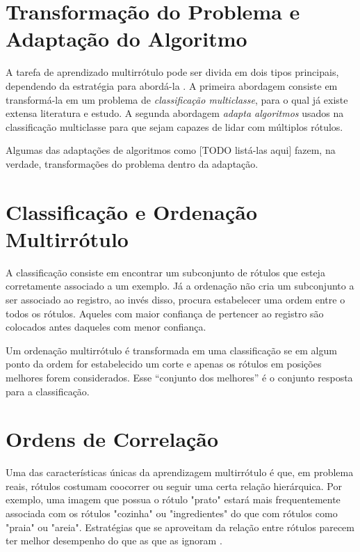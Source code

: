 \documentclass[runningheads,a4paper]{llncs}
\begin{document}
\section{Transformação do Problema e Adaptação do Algoritmo}

A tarefa de aprendizado multirrótulo pode ser divida em dois tipos principais, dependendo da estratégia para abordá-la \cite{Tsoumakas2009-vw}. A primeira abordagem consiste em transformá-la em um problema de \textit{classificação multiclasse}, para o qual já existe extensa literatura e estudo. A segunda abordagem \textit{adapta algoritmos} usados na classificação multiclasse para que sejam capazes de lidar com múltiplos rótulos.

Algumas das adaptações de algoritmos como [TODO listá-las aqui] fazem, na verdade, transformações do problema dentro da adaptação.

\section{Classificação e Ordenação Multirrótulo} \label{sec:classord}

A classificação consiste em encontrar um subconjunto de rótulos que esteja corretamente associado a um exemplo. Já a ordenação não cria um subconjunto a ser associado ao registro, ao invés disso, procura estabelecer uma ordem entre o todos os rótulos. Aqueles com maior confiança de pertencer ao registro são colocados antes daqueles com menor confiança.

Um ordenação multirrótulo é transformada em uma classificação se em algum ponto da ordem for estabelecido um corte e apenas os rótulos em posições melhores forem considerados. Esse \enquote{conjunto dos melhores} é o conjunto resposta para a classificação.

\section{Ordens de Correlação}

Uma das características únicas da aprendizagem multirrótulo é que, em problema reais, rótulos costumam coocorrer ou seguir uma certa relação hierárquica. Por exemplo, uma imagem que possua o rótulo "prato" estará mais frequentemente associada com os rótulos "cozinha" ou "ingredientes" do que com rótulos como "praia" ou "areia". Estratégias que se aproveitam da relação entre rótulos parecem ter melhor desempenho do que as que as ignoram \cite{Zhang2010-ee}.
\end{document}

